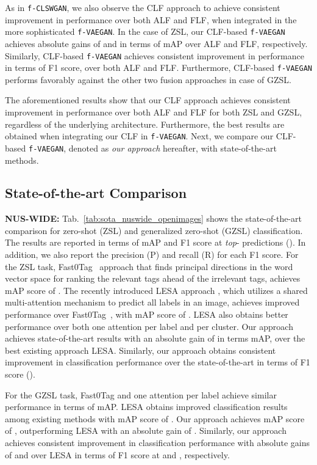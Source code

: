 \documentclass[final]{cvpr}
\newcommand{\clswgan}{\texttt{f-CLSWGAN}}
\newcommand{\vaegan}{\texttt{f-VAEGAN}}
\begin{document}
As in \clswgan{}, we also observe the CLF approach to achieve consistent improvement in performance over both ALF and FLF, when integrated in the more sophisticated \vaegan{}. In the case of ZSL, our CLF-based \vaegan{} achieves absolute gains of  and  in terms of mAP over ALF and FLF, respectively. Similarly, CLF-based \vaegan{} achieves consistent improvement in performance in terms of F1 score, over both ALF and FLF. Furthermore, CLF-based \vaegan{}  performs favorably against the other two fusion approaches in case of GZSL.

The aforementioned results show that our CLF approach achieves consistent improvement in performance over both ALF and FLF for both ZSL and GZSL, regardless of the underlying architecture. Furthermore, the best results are obtained when integrating our CLF in \vaegan{}. Next, we compare our CLF-based \vaegan{}, denoted as \textit{our approach} hereafter, with state-of-the-art methods.

\subsection{State-of-the-art Comparison\label{sec:sota_compare}}

\noindent\textbf{NUS-WIDE:} 
Tab.~\ref{tab:sota_nuswide_openimages} shows the state-of-the-art comparison for zero-shot (ZSL) and generalized zero-shot (GZSL) classification. The results are reported in terms of mAP and F1 score at \textit{top}- predictions (). In addition, we also report the precision (P) and recall (R) for each F1 score.  For the ZSL task, Fast0Tag~\cite{zhang2016fast} approach that finds principal directions in the word vector space for ranking the relevant tags ahead of the irrelevant tags, achieves mAP score of . The recently introduced LESA approach \cite{huynh2020shared}, which utilizes a shared multi-attention mechanism to predict all labels in an image, achieves improved performance over Fast0Tag~\cite{zhang2016fast}, with mAP score of . LESA also obtains better performance over both one attention per label and per cluster. Our approach achieves state-of-the-art results with an absolute gain of  in terms mAP, over the best existing approach LESA. Similarly, our approach obtains consistent improvement in classification performance over the state-of-the-art in terms of F1 score (). 

For the GZSL task, Fast0Tag and one attention per label achieve similar performance in terms of mAP. LESA obtains improved classification results among existing methods with mAP score of . Our approach achieves mAP score of , outperforming LESA with an absolute gain of . Similarly, our approach achieves consistent improvement in classification performance with absolute gains of  and  over LESA in terms of F1 score at  and , respectively.
\end{document}
